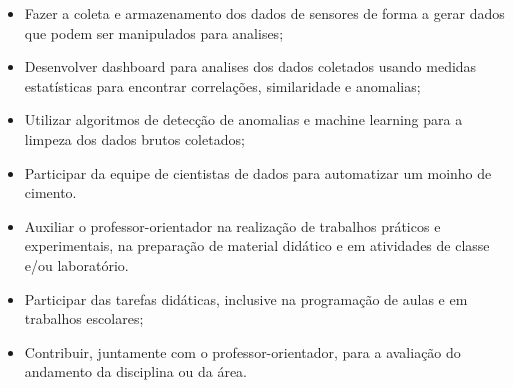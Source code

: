 \documentclass[10pt,a4paper,ragged2e]{altacv}
\begin{document}
\begin{itemize}
    \item Fazer a coleta e armazenamento dos dados de sensores de forma a gerar dados que podem ser manipulados para analises;
    \item Desenvolver dashboard para analises dos dados coletados usando medidas estatísticas para encontrar correlações, similaridade e anomalias;
    \item Utilizar algoritmos de detecção de anomalias e machine learning para a limpeza dos dados brutos coletados;
    \item Participar da equipe de cientistas de dados para automatizar um moinho de cimento.
\end{itemize}

\vspace{10px}


\begin{itemize}
    \item Auxiliar o professor-orientador na realização de trabalhos práticos e experimentais, na preparação de material didático e em atividades de classe e/ou laboratório.
\end{itemize}

\vspace{10px}
\vspace{10px}

\begin{itemize}
    \item Participar das tarefas didáticas, inclusive na programação de aulas e em trabalhos escolares;
    \item Contribuir, juntamente com o professor-orientador, para a avaliação do andamento da disciplina ou da área.
\end{itemize}
\end{document}

